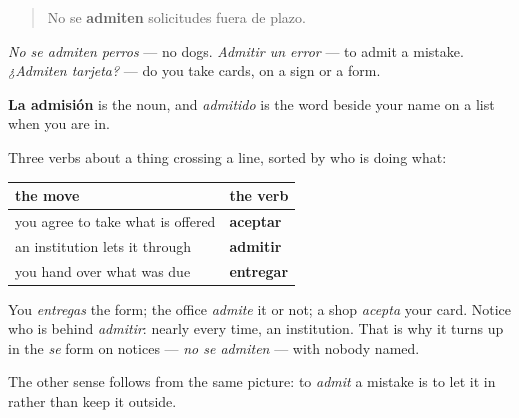 \begin{quote}
No se \textbf{admiten} solicitudes fuera de plazo.
\end{quote}

\emph{No se admiten perros} — no dogs. \emph{Admitir un error} — to admit a mistake. \emph{¿Admiten tarjeta?} — do you take cards, on a sign or a form.

\textbf{La admisión} is the noun, and \emph{admitido} is the word beside your name on a list when you are in.

\begin{grammarlens}[title={Grammar Lens: admitir, aceptar, entregar}]
Three verbs about a thing crossing a line, sorted by who is doing what:

\noindent
\begin{tabularx}{\linewidth}{@{}>{\raggedright\arraybackslash}X>{\raggedright\arraybackslash}X@{}}
\toprule
\textbf{the move} & \textbf{the verb} \\
\midrule
you agree to take what is offered & \textbf{aceptar} \\
an institution lets it through & \textbf{admitir} \\
you hand over what was due & \textbf{entregar} \\
\bottomrule
\end{tabularx}

You \emph{entregas} the form; the office \emph{admite} it or not; a shop \emph{acepta} your card. Notice who is behind \emph{admitir}: nearly every time, an institution. That is why it turns up in the \emph{se} form on notices — \emph{no se admiten} — with nobody named.

The other sense follows from the same picture: to \emph{admit} a mistake is to let it in rather than keep it outside.
\end{grammarlens}


